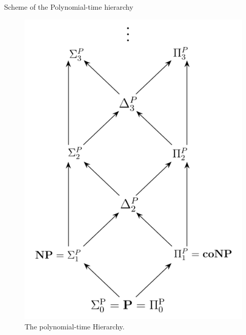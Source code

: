         \begin{frame}{Scheme of the Polynomial-time hierarchy}            
            \begin{figure}
                \centering
                \includegraphics[scale=.4]{images/PH.png}
                \caption{The polynomial-time Hierarchy.}
                \label{fig:The Polynomial-time Hierarchy}
            \end{figure}
        \end{frame}

